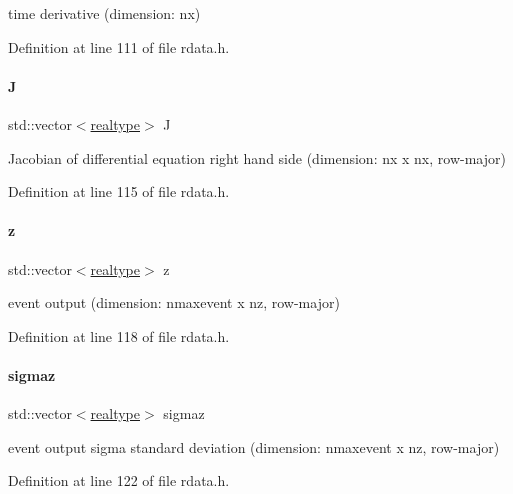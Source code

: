 time derivative (dimension\+: nx) 

Definition at line 111 of file rdata.\+h.

\mbox{\label{classamici_1_1_return_data_a6eee8c09315a85f7213d679fcb2aef85}} 
\paragraph{\texorpdfstring{J}{J}}
{\footnotesize\ttfamily std\+::vector$<$\mbox{\hyperlink{namespaceamici_a1bdce28051d6a53868f7ccbf5f2c14a3}{realtype}}$>$ J}

Jacobian of differential equation right hand side (dimension\+: nx x nx, row-\/major) 

Definition at line 115 of file rdata.\+h.

\mbox{\label{classamici_1_1_return_data_a8ed223273385c1e7fff94cfa8ca81d45}} 
\paragraph{\texorpdfstring{z}{z}}
{\footnotesize\ttfamily std\+::vector$<$\mbox{\hyperlink{namespaceamici_a1bdce28051d6a53868f7ccbf5f2c14a3}{realtype}}$>$ z}

event output (dimension\+: nmaxevent x nz, row-\/major) 

Definition at line 118 of file rdata.\+h.

\mbox{\label{classamici_1_1_return_data_adc3c5ee1620b079cd34137010873f500}} 
\paragraph{\texorpdfstring{sigmaz}{sigmaz}}
{\footnotesize\ttfamily std\+::vector$<$\mbox{\hyperlink{namespaceamici_a1bdce28051d6a53868f7ccbf5f2c14a3}{realtype}}$>$ sigmaz}

event output sigma standard deviation (dimension\+: nmaxevent x nz, row-\/major) 

Definition at line 122 of file rdata.\+h.

\mbox{\label{classamici_1_1_return_data_a6588db55743b7fdebe807b52387d6b37}} 
